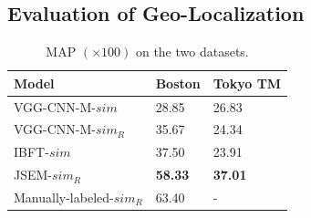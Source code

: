 \subsection{Evaluation of Geo-Localization}
\begin{table}[htbp]
\begin{tabular}{|l|l|l|}
\hline
Model & Boston & Tokyo TM\\
\hline \hline
VGG-CNN-M-$sim$ & 28.85 & 26.83\\
VGG-CNN-M-$sim_R$ & 35.67 & 24.34\\
IBFT-$sim$ & 37.50 & 23.91\\
JSEM-$sim_R$ & \textbf{58.33} & \textbf{37.01}\\
Manually-labeled-$sim_R$ & 63.40 & -\\
\hline
\end{tabular}
\caption{MAP $(\times 100)$ on the two datasets.}
\label{table:map}
\end{table}

